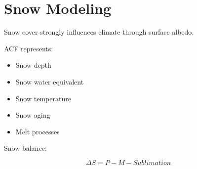 \section{Snow Modeling}


Snow cover strongly influences climate through surface albedo.



ACF represents:


\begin{itemize}

\item Snow depth

\item Snow water equivalent

\item Snow temperature

\item Snow aging

\item Melt processes

\end{itemize}



Snow balance:


\[
\Delta S=P-M-Sublimation
\]
